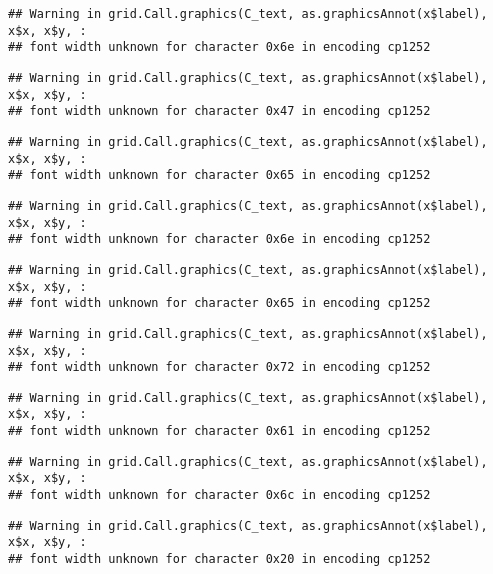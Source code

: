 \documentclass[
]{article}
\begin{document}
\begin{verbatim}
## Warning in grid.Call.graphics(C_text, as.graphicsAnnot(x$label), x$x, x$y, :
## font width unknown for character 0x6e in encoding cp1252
\end{verbatim}

\begin{verbatim}
## Warning in grid.Call.graphics(C_text, as.graphicsAnnot(x$label), x$x, x$y, :
## font width unknown for character 0x47 in encoding cp1252
\end{verbatim}

\begin{verbatim}
## Warning in grid.Call.graphics(C_text, as.graphicsAnnot(x$label), x$x, x$y, :
## font width unknown for character 0x65 in encoding cp1252
\end{verbatim}

\begin{verbatim}
## Warning in grid.Call.graphics(C_text, as.graphicsAnnot(x$label), x$x, x$y, :
## font width unknown for character 0x6e in encoding cp1252
\end{verbatim}

\begin{verbatim}
## Warning in grid.Call.graphics(C_text, as.graphicsAnnot(x$label), x$x, x$y, :
## font width unknown for character 0x65 in encoding cp1252
\end{verbatim}

\begin{verbatim}
## Warning in grid.Call.graphics(C_text, as.graphicsAnnot(x$label), x$x, x$y, :
## font width unknown for character 0x72 in encoding cp1252
\end{verbatim}

\begin{verbatim}
## Warning in grid.Call.graphics(C_text, as.graphicsAnnot(x$label), x$x, x$y, :
## font width unknown for character 0x61 in encoding cp1252
\end{verbatim}

\begin{verbatim}
## Warning in grid.Call.graphics(C_text, as.graphicsAnnot(x$label), x$x, x$y, :
## font width unknown for character 0x6c in encoding cp1252
\end{verbatim}

\begin{verbatim}
## Warning in grid.Call.graphics(C_text, as.graphicsAnnot(x$label), x$x, x$y, :
## font width unknown for character 0x20 in encoding cp1252
\end{verbatim}
\end{document}
